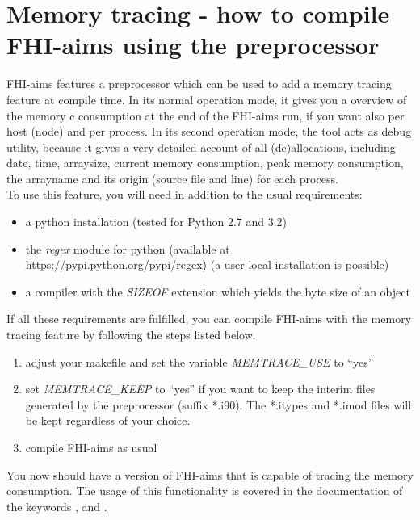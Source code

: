 \chapter[Memory Tracing]{Memory tracing - how to compile FHI-aims using the preprocessor}
\label{appendix_memtrace}

FHI-aims features a preprocessor which can be used to add a memory tracing feature at
compile time. In its normal operation mode, it gives you a overview of the memory c
consumption at the end of the FHI-aims run, if you want also per host (node) and per process.
In its second operation mode, the tool acts as debug utility, because it gives a very
detailed account of all (de)allocations, including date, time, arraysize, current memory
consumption, peak memory consumption, the arrayname and its origin (source file and
line) for each process.\\
To use this feature, you will need in addition to the usual requirements:
\begin{itemize}
    \item a python installation (tested for Python 2.7 and 3.2)
    \item the \emph{regex} module for python (available at
        \url{https://pypi.python.org/pypi/regex}) (a user-local installation  is possible)
    \item a compiler with the \emph{SIZEOF} extension which yields the byte size of an
        object
\end{itemize}
If all these requirements are fulfilled, you can compile FHI-aims with the memory tracing
feature by following the steps listed below.
\begin{enumerate}
    \item adjust your makefile and set the variable \emph{MEMTRACE\_USE} to ``yes''
    \item set \emph{MEMTRACE\_KEEP} to ``yes'' if you want to keep the interim files
        generated by the preprocessor (suffix *.i90). The *.itypes and *.imod files will
        be kept regardless of your choice.
    \item compile FHI-aims as usual
\end{enumerate}
You now should have a version of FHI-aims that is capable of tracing the memory
consumption. The usage of this functionality is covered in the documentation of the keywords
,  and .